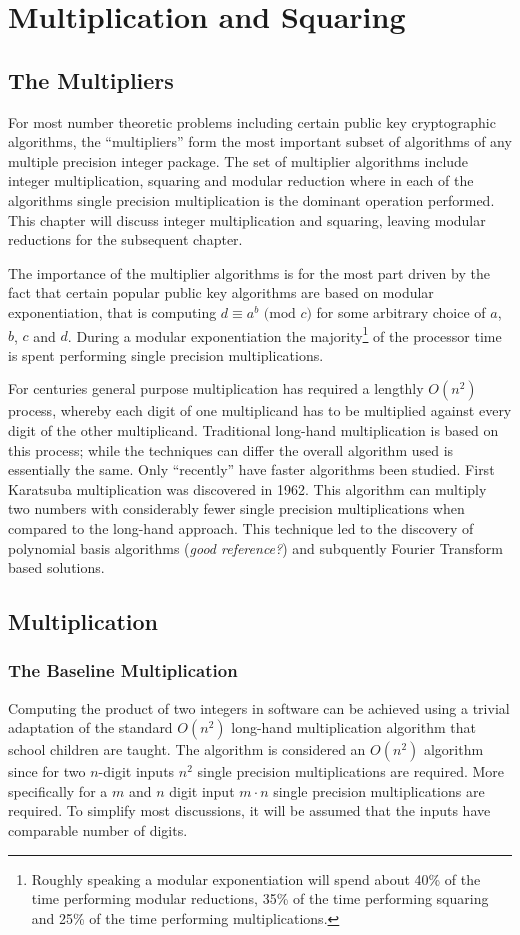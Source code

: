 \documentclass[b5paper]{book}
\begin{document}
\chapter{Multiplication and Squaring}
\section{The Multipliers}
For most number theoretic problems including certain public key cryptographic algorithms, the ``multipliers'' form the most important subset of 
algorithms of any multiple precision integer package.  The set of multiplier algorithms include integer multiplication, squaring and modular reduction 
where in each of the algorithms single precision multiplication is the dominant operation performed.  This chapter will discuss integer multiplication 
and squaring, leaving modular reductions for the subsequent chapter.  

The importance of the multiplier algorithms is for the most part driven by the fact that certain popular public key algorithms are based on modular 
exponentiation, that is computing $d \equiv a^b \mbox{ (mod }c\mbox{)}$ for some arbitrary choice of $a$, $b$, $c$ and $d$.  During a modular
exponentiation the majority\footnote{Roughly speaking a modular exponentiation will spend about 40\% of the time performing modular reductions, 
35\% of the time performing squaring and 25\% of the time performing multiplications.} of the processor time is spent performing single precision 
multiplications.

For centuries general purpose multiplication has required a lengthly $O(n^2)$ process, whereby each digit of one multiplicand has to be multiplied 
against every digit of the other multiplicand.  Traditional long-hand multiplication is based on this process;  while the techniques can differ the 
overall algorithm used is essentially the same.  Only ``recently'' have faster algorithms been studied.  First Karatsuba multiplication was discovered in 
1962.  This algorithm can multiply two numbers with considerably fewer single precision multiplications when compared to the long-hand approach.  
This technique led to the discovery of polynomial basis algorithms (\textit{good reference?}) and subquently Fourier Transform based solutions.  

\section{Multiplication}
\subsection{The Baseline Multiplication}
Computing the product of two integers in software can be achieved using a trivial adaptation of the standard $O(n^2)$ long-hand multiplication
algorithm that school children are taught.  The algorithm is considered an $O(n^2)$ algorithm since for two $n$-digit inputs $n^2$ single precision 
multiplications are required.  More specifically for a $m$ and $n$ digit input $m \cdot n$ single precision multiplications are required.  To 
simplify most discussions, it will be assumed that the inputs have comparable number of digits.  
\end{document}

